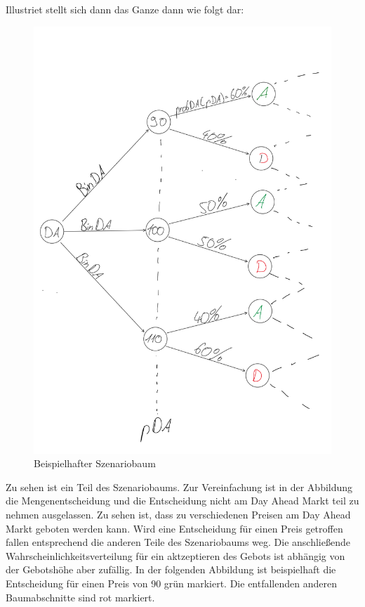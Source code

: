 \documentclass{article}
\begin{document}
Illustriet stellt sich dann das Ganze dann wie folgt dar:
\begin{figure}[H]
    \centering
    \includegraphics[width=1\linewidth]{pictures/szBaumBeispiel1.png}
    \caption{Beispielhafter Szenariobaum}
    \label{fig:enter-label}
\end{figure}
Zu sehen ist ein Teil des Szenariobaums. Zur Vereinfachung ist in der Abbildung die Mengenentscheidung und die Entscheidung nicht am Day Ahead Markt teil zu nehmen ausgelassen. Zu sehen ist, dass zu verschiedenen Preisen am Day Ahead Markt geboten werden kann. 
Wird eine Entscheidung für einen Preis getroffen fallen entsprechend die anderen Teile des Szenariobaums weg.
Die anschließende Wahrscheinlichkeitsverteilung für ein aktzeptieren des Gebots ist abhängig von der Gebotshöhe aber zufällig.
In der folgenden Abbildung ist beispielhaft die Entscheidung für einen Preis von 90 grün markiert. Die entfallenden anderen Baumabschnitte sind rot markiert.\\
\end{document}
